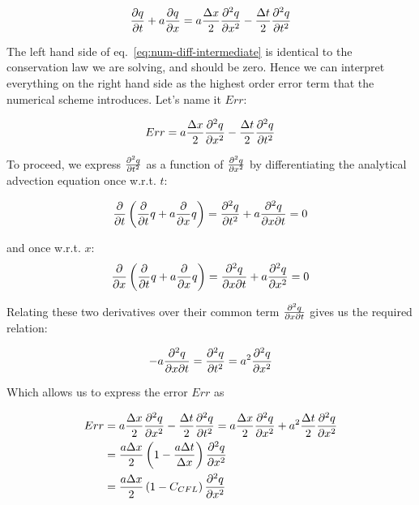 \begin{align}
   \frac{\partial q}{\partial t} + a \frac{\partial q}{\partial x} =
   a \frac{\Delta x}{2} \frac{\partial^2 q}{\partial x^2}
   - \frac{\Delta t}{2} \frac{\partial^2 q}{\partial t^2} \label{eq:num-diff-intermediate}
\end{align}

The left hand side of eq.~\ref{eq:num-diff-intermediate} is identical to the conservation law we
are solving, and should be zero. Hence we can interpret everything on the right hand side as the
highest order error term that the numerical scheme introduces. Let's name it $Err$:

\begin{align}
    Err =
    a \frac{\Delta x}{2} \frac{\partial^2 q}{\partial x^2}
    - \frac{\Delta t}{2} \frac{\partial^2 q}{\partial t^2} \label{eq:num-diff-error}
\end{align}

To proceed, we express $\frac{\partial^2 q}{\partial t^2}$ as a function of $\frac{\partial^2 q}{\partial x^2}$
by differentiating the analytical advection equation once w.r.t. $t$:

\begin{align}
    \frac{\partial}{\partial t} \left( \frac{\partial}{\partial t} q + a \frac{\partial}{\partial x} q \right) =
    \frac{\partial^2 q}{\partial t^2} + a \frac{\partial^2 q}{\partial x \partial t} = 0
\end{align}

and once w.r.t. $x$:
\begin{align}
    \frac{\partial}{\partial x} \left( \frac{\partial}{\partial t} q + a \frac{\partial}{\partial x} q \right) =
    \frac{\partial^2 q}{\partial x \partial t} + a \frac{\partial^2 q}{\partial x^2} = 0
\end{align}

Relating these two derivatives over their common term $\frac{\partial^2 q}{\partial x \partial t}$ gives us
the required relation:

\begin{align}
  -a \frac{\partial^2 q}{\partial x \partial t}  =
      \frac{\partial^2 q}{\partial t^2} = a^2 \frac{\partial^2 q}{\partial x^2}
\end{align}

Which allows us to express the error $Err$ as

\begin{align}
    Err &=
    a \frac{\Delta x}{2} \frac{\partial^2 q}{\partial x^2}
    - \frac{\Delta t}{2} \frac{\partial^2 q}{\partial t^2}
    =
    a \frac{\Delta x}{2} \frac{\partial^2 q}{\partial x^2}
    + a^2 \frac{\Delta t}{2} \frac{\partial^2 q}{\partial x^2} \\
    &= \frac{a \Delta x}{2} \left( 1 - \frac{a \Delta t}{\Delta x} \right)
        \frac{\partial^2 q}{\partial x^2} \\
    &= \frac{a \Delta x}{2} \left( 1 - C_{CFL} \right)
        \frac{\partial^2 q}{\partial x^2}
\end{align}

